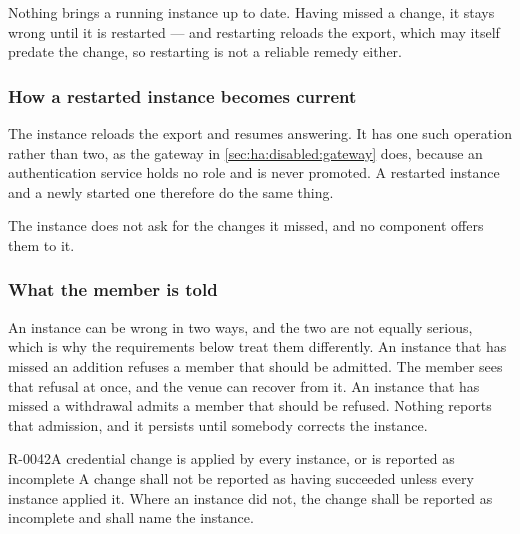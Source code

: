 \begin{gap}{}
  Nothing brings a running instance up to date. Having missed a change, it stays
  wrong until it is restarted --- and restarting reloads the export, which may
  itself predate the change, so restarting is not a reliable remedy either.
\end{gap}

\subsubsection{How a restarted instance becomes current}
\label{sec:ha:disabled:auth:recovery}

The instance reloads the export and resumes answering. It has one such operation
rather than two, as the gateway in \cref{sec:ha:disabled:gateway} does, because
an authentication service holds no role and is never promoted. A restarted
instance and a newly started one therefore do the same thing.

The instance does not ask for the changes it missed, and no component offers them
to it.

\subsubsection{What the member is told}
\label{sec:ha:disabled:auth:member}

An instance can be wrong in two ways, and the two are not equally serious, which
is why the requirements below treat them differently. An instance that has missed
an addition refuses a member that should be admitted. The member sees that
refusal at once, and the venue can recover from it. An instance that has missed a
withdrawal admits a member that should be refused. Nothing reports that
admission, and it persists until somebody corrects the instance.

\begin{requirement}{R-0042}{A credential change is applied by every instance, or is reported as incomplete}
  A change shall not be reported as having succeeded unless every instance
  applied it. Where an instance did not, the change shall be reported as
  incomplete and shall name the instance.
\end{requirement}

